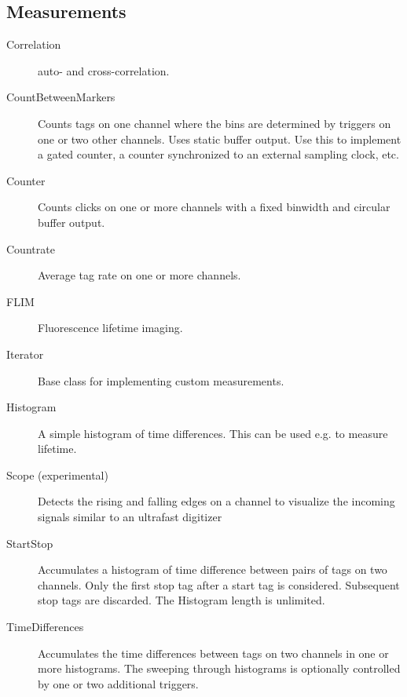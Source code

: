 \documentclass[letterpaper,10pt,english]{sphinxmanual}
\begin{document}
\subsection{Measurements}
\label{sections/api:measurements}\begin{description}
\item[{Correlation}] \leavevmode
auto- and cross-correlation.

\item[{CountBetweenMarkers}] \leavevmode
Counts tags on one channel where the bins are
determined by triggers on one or two other channels. Uses static buffer
output. Use this to implement a gated counter, a counter synchronized to
an external sampling clock, etc.

\item[{Counter}] \leavevmode
Counts clicks on one or more channels with a fixed binwidth and
circular buffer output.

\item[{Countrate}] \leavevmode
Average tag rate on one or more channels.

\item[{FLIM}] \leavevmode
Fluorescence lifetime imaging.

\item[{Iterator}] \leavevmode
Base class for implementing custom measurements.

\item[{Histogram}] \leavevmode
A simple histogram of time differences. This can be used e.g.
to measure lifetime.

\item[{Scope (experimental)}] \leavevmode
Detects the rising and falling edges on a channel to visualize the incoming signals similar to an ultrafast digitizer

\item[{StartStop}] \leavevmode
Accumulates a histogram of time difference between
pairs of tags on two channels. Only the first stop tag after a start tag is
considered. Subsequent stop tags are discarded. The Histogram length is
unlimited.

\item[{TimeDifferences}] \leavevmode
Accumulates the time differences between tags on two
channels in one or more histograms. The sweeping through
histograms is optionally controlled by one or two additional triggers.

\end{description}
\end{document}
